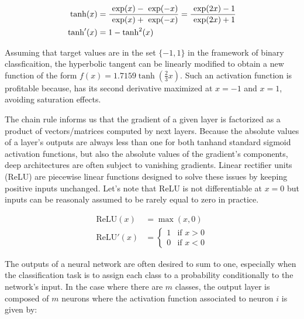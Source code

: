         \begin{equation}
            \begin{split}
                \tanh(x) & = \frac{\text{ exp}(x) - \text{ exp}(-x)}{\text{ exp}(x) + \text{ exp}(-x)} = \frac{\text{ exp}(2x) - 1}{\text{ exp}(2x) + 1} \\
                \tanh'(x) & = 1 - \tanh^2(x)
            \end{split}
        \end{equation}

        Assuming that target values are in the set $\{-1, 1\}$ in the framework of binary classficaition,
        the hyperbolic tangent can be linearly modified to obtain a new function of the form $f(x) = 1.7159 \tanh(\frac{2}{3} x)$.
        Such an activation function is profitable because, has its second derivative maximized at $x = -1$ and $x = 1$, avoiding
        saturation effects.

        The chain rule informs us that the gradient of a given layer is factorized as a product of vectors/matrices computed by next layers.
        Because the absolute values of a layer's outputs are always less than one for both tanhand standard
        sigmoid activation functions, but also the absolute values of the gradient's components,
        deep architectures are often subject to vanishing gradients. Linear rectifier units (ReLU) are piecewise linear functions designed to solve
        these issues by keeping positive inputs unchanged.
        Let's note that ReLU is not differentiable at $x = 0$ but inputs can be reasonaly assumed to be rarely equal to zero in practice.

        \begin{equation}
            \begin{split}
                \text{ReLU}(x) & = \max{(x, 0)} \\
                \text{ReLU}'(x) & =
                \begin{cases}
                    1 & \text{if } x > 0 \\
                    0 & \text{if } x < 0
                \end{cases}
            \end{split}
        \end{equation}

        The outputs of a neural network are often desired to sum to one, especially when the classification task is to assign each class to a probability
        conditionally to the network's input. In the case where there are $m$ classes, the output layer is composed of $m$ neurons where the activation
        function associated to neuron $i$ is given by:

